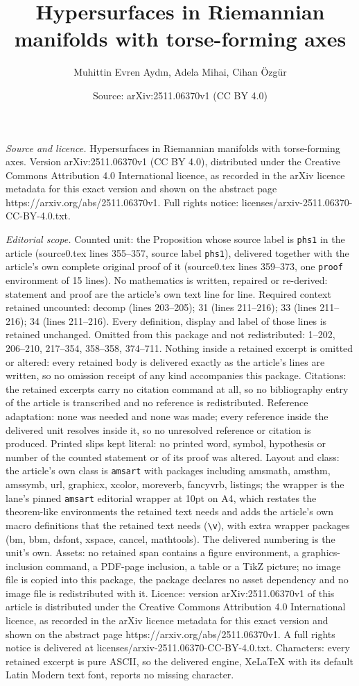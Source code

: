 \documentclass[10pt,a4paper]{amsart}
\title[Hypersurfaces in Riemannian manifolds with torse-forming axe]{Hypersurfaces in Riemannian manifolds with torse-forming axes}
\author{Muhittin Evren Ayd{\i}n, Adela Mihai, Cihan \"Ozg\"ur}
\date{Source: arXiv:2511.06370v1 (CC BY 4.0)}
\begin{document}
\maketitle

\noindent\emph{Source and licence.} Hypersurfaces in Riemannian manifolds with torse-forming axes. Version arXiv:2511.06370v1 (CC BY 4.0), distributed under the Creative Commons Attribution 4.0 International licence, as recorded in the arXiv licence metadata for this exact version and shown on the abstract page https://arxiv.org/abs/2511.06370v1. Full rights notice: licenses/arxiv-2511.06370-CC-BY-4.0.txt.\par\smallskip

\noindent\textit{Editorial scope.} Counted unit: the Proposition whose source label is \texttt{phs1} in the article (source0.tex lines 355--357, source label \texttt{phs1}), delivered together with the article's own complete original proof of it (source0.tex lines 359--373, one \texttt{proof} environment of 15 lines). No mathematics is written, repaired or re-derived: statement and proof are the article's own text line for line. Required context retained uncounted: decomp (lines 203--205); 31 (lines 211--216); 33 (lines 211--216); 34 (lines 211--216). Every definition, display and label of those lines is retained unchanged. Omitted from this package and not redistributed: 1--202, 206--210, 217--354, 358--358, 374--711. Nothing inside a retained excerpt is omitted or altered: every retained body is delivered exactly as the article's lines are written, so no omission receipt of any kind accompanies this package. Citations: the retained excerpts carry no citation command at all, so no bibliography entry of the article is transcribed and no reference is redistributed. Reference adaptation: none was needed and none was made; every reference inside the delivered unit resolves inside it, so no unresolved reference or citation is produced. Printed slips kept literal: no printed word, symbol, hypothesis or number of the counted statement or of its proof was altered. Layout and class: the article's own class is \texttt{amsart} with packages including amsmath, amsthm, amssymb, url, graphicx, xcolor, moreverb, fancyvrb, listings; the wrapper is the lane's pinned \texttt{amsart} editorial wrapper at 10pt on A4, which restates the theorem-like environments the retained text needs and adds the article's own macro definitions that the retained text needs (\texttt{\textbackslash v}), with extra wrapper packages (bm, bbm, dsfont, xspace, cancel, mathtools). The delivered numbering is the unit's own. Assets: no retained span contains a figure environment, a graphics-inclusion command, a PDF-page inclusion, a table or a TikZ picture; no image file is copied into this package, the package declares no asset dependency and no image file is redistributed with it. Licence: version arXiv:2511.06370v1 of this article is distributed under the Creative Commons Attribution 4.0 International licence, as recorded in the arXiv licence metadata for this exact version and shown on the abstract page https://arxiv.org/abs/2511.06370v1. A full rights notice is delivered at licenses/arxiv-2511.06370-CC-BY-4.0.txt. Characters: every retained excerpt is pure ASCII, so the delivered engine, XeLaTeX with its default Latin Modern text font, reports no missing character.
\end{document}
